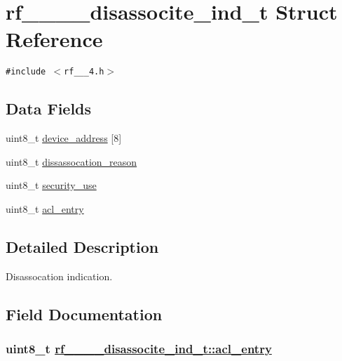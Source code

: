 \hypertarget{structrf__802__15__4__disassocite__ind__t}{
\section{rf\_\_\_\_\-disassocite\_\-ind\_\-t Struct Reference}
\label{structrf__802__15__4__disassocite__ind__t}
}
{\tt \#include $<$rf\_\_\_\-4.h$>$}

\subsection*{Data Fields}
\begin{CompactItemize}
\item 
uint8\_\-t \hyperlink{structrf__802__15__4__disassocite__ind__t_4c05ddc66f34dbd413ffede2dff8af78}{device\_\-address} \mbox{[}8\mbox{]}
\item 
uint8\_\-t \hyperlink{structrf__802__15__4__disassocite__ind__t_3e3ee684fbf3997039fd244e72746c91}{dissassocation\_\-reason}
\item 
uint8\_\-t \hyperlink{structrf__802__15__4__disassocite__ind__t_9cc973eea95551ccb75254d9eb3fd60a}{security\_\-use}
\item 
uint8\_\-t \hyperlink{structrf__802__15__4__disassocite__ind__t_8341fae36b6445ff2ffde3436eddd5f2}{acl\_\-entry}
\end{CompactItemize}


\subsection{Detailed Description}
Disassocation indication. 



\subsection{Field Documentation}
\hypertarget{structrf__802__15__4__disassocite__ind__t_8341fae36b6445ff2ffde3436eddd5f2}{
\subsubsection[acl\_\-entry]{\setlength{\rightskip}{0pt plus 5cm}uint8\_\-t \hyperlink{structrf__802__15__4__disassocite__ind__t_8341fae36b6445ff2ffde3436eddd5f2}{rf\_\_\_\_\-disassocite\_\-ind\_\-t::acl\_\-entry}}}
\label{structrf__802__15__4__disassocite__ind__t_8341fae36b6445ff2ffde3436eddd5f2}


